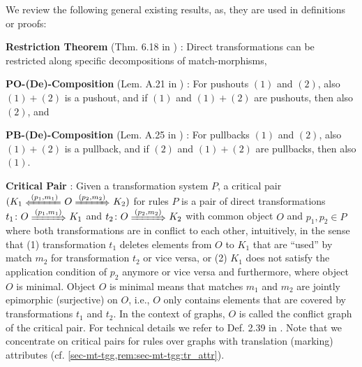 \vspace{-1.5ex}
We review the following general existing results, as, they are used in definitions or proofs:
\begin{enumerate*}
\item [\textbf{Restriction Theorem} (Thm. 6.18 in \cite{Ehrig:2006:FAG:1121741})]: Direct transformations can be restricted along specific decompositions of match-morphisms,
\item [\textbf{PO-(De)-Composition} (Lem. A.21 in \cite{Ehrig:2006:FAG:1121741})]: For pushouts $(1)$ and $(2)$, also $(1)+(2)$ is a pushout, and if $(1)$ and $(1)+(2)$ are pushouts, then also $(2)$, and
\item [\textbf{PB-(De)-Composition} (Lem. A.25 in \cite{Ehrig:2006:FAG:1121741})]: For pullbacks $(1)$ and $(2)$, also $(1)+(2)$ is a pullback, and if $(2)$ and $(1)+(2)$ are pullbacks, then also $(1)$.
\item [\textbf{Critical Pair}]: Given a transformation system $P$, a critical pair $(K_1 \TransB{(p_1,m_1)} O \Trans{(p_2,m_2)} K_2)$ for rules $P$ is a pair of direct transformations $t_1\colon O \Trans{(p_1,m_1)} K_1$ and $t_2\colon O \Trans{(p_2,m_2)} K_2$ with common object $O$ and $p_1,p_2 \in P$ where both transformations are in conflict to each other, intuitively, in the sense that
(1) transformation $t_1$ deletes elements from $O$ to $K_1$ that are ``used'' by match $m_2$ for transformation $t_2$ or vice versa, or
(2) $K_1$ does not satisfy the application condition of $p_2$ anymore or vice versa
and furthermore, where object $O$ is minimal.
Object $O$ is minimal means that matches $m_1$ and $m_2$ are jointly epimorphic (surjective) on $O$, i.e., $O$ only contains elements that are covered by transformations $t_1$ and $t_2$.
In the context of graphs, $O$ is called the conflict graph of the critical pair.
For technical details we refer to Def. 2.39 in \cite{FAGT2}.
Note that we concentrate on critical pairs for rules over graphs with translation (marking) attributes (cf. \cref{sec-mt-tgg,rem:sec-mt-tgg:tr_attr}).

\end{enumerate*}
